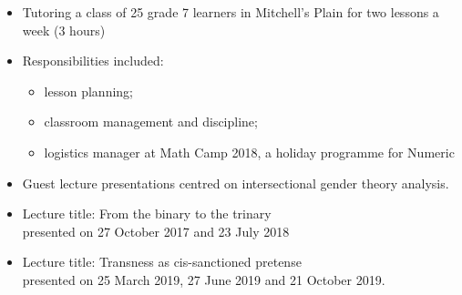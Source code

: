 \documentclass[10pt,a4paper]{altacv}
\begin{document}

\begin{fullwidth}
\makecvheader
\end{fullwidth}



\begin{itemize}
\item Tutoring a class of 25 grade 7 learners in Mitchell's Plain for two lessons a week (3 hours)
\item Responsibilities included:
  \begin{itemize}
    \item lesson planning;
    \item classroom management and discipline;
    \item logistics manager at Math Camp 2018, a holiday programme for Numeric
  \end{itemize}

\end{itemize}

\divider


\begin{itemize}
\item Guest lecture presentations centred on intersectional gender theory analysis.
\item Lecture title: From the binary to the trinary \\
presented on 27 October 2017 and 23 July 2018
\item Lecture title: Transness as cis-sanctioned pretense\\
presented on 25 March 2019, 27 June 2019 and 21 October 2019.  

\end{itemize}
\end{document}
